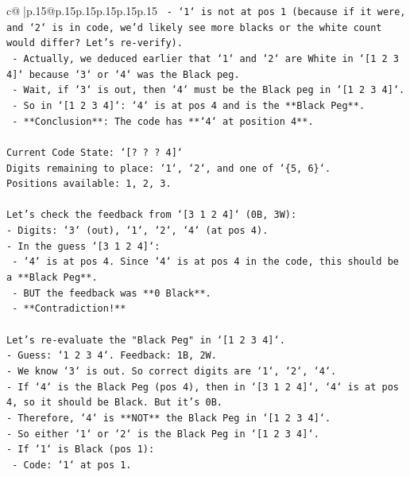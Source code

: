 \documentclass{article}
\begin{document}
{\begin{supertabular}{c@{$\;$}|p{.15\linewidth}@{}p{.15\linewidth}p{.15\linewidth}p{.15\linewidth}p{.15\linewidth}p{.15\linewidth}}
{{{\texttt{    {-} `1` is not at pos 1 (because if it were, and `2` is in code, we'd likely see more blacks or the white count would differ? Let's re{-}verify).} \\
\texttt{    {-} Actually, we deduced earlier that `1` and `2` are White in `{[}1 2 3 4{]}` because `3` or `4` was the Black peg.} \\
\texttt{    {-} Wait, if `3` is out, then `4` must be the Black peg in `{[}1 2 3 4{]}`.} \\
\texttt{    {-} So in `{[}1 2 3 4{]}`: `4` is at pos 4 and is the **Black Peg**.} \\
\texttt{    {-} **Conclusion**: The code has **`4` at position 4**.} \\
\\ 
\texttt{Current Code State: `{[}? ? ? 4{]}`} \\
\texttt{Digits remaining to place: `1`, `2`, and one of `\{5, 6\}`.} \\
\texttt{Positions available: 1, 2, 3.} \\
\\ 
\texttt{Let's check the feedback from `{[}3 1 2 4{]}` (0B, 3W):} \\
\texttt{{-} Digits: `3` (out), `1`, `2`, `4` (at pos 4).} \\
\texttt{{-} In the guess `{[}3 1 2 4{]}`:} \\
\texttt{    {-} `4` is at pos 4. Since `4` is at pos 4 in the code, this should be a **Black Peg**.} \\
\texttt{    {-} BUT the feedback was **0 Black**.} \\
\texttt{    {-} **Contradiction!**} \\
\\ 
\texttt{Let's re{-}evaluate the "Black Peg" in `{[}1 2 3 4{]}`.} \\
\texttt{{-} Guess: `1 2 3 4`. Feedback: 1B, 2W.} \\
\texttt{{-} We know `3` is out. So correct digits are `1`, `2`, `4`.} \\
\texttt{{-} If `4` is the Black Peg (pos 4), then in `{[}3 1 2 4{]}`, `4` is at pos 4, so it should be Black. But it's 0B.} \\
\texttt{{-} Therefore, `4` is **NOT** the Black Peg in `{[}1 2 3 4{]}`.} \\
\texttt{{-} So either `1` or `2` is the Black Peg in `{[}1 2 3 4{]}`.} \\
\texttt{{-} If `1` is Black (pos 1):} \\
\texttt{    {-} Code: `1` at pos 1.} \\
}}}
\end{supertabular}}
\end{document}
